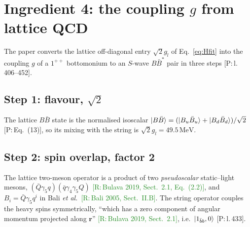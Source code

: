 \documentclass[11pt,a4paper]{article}
\newcommand{\tagP}[1]{\textcolor{blue!65!black}{\textsf{\small[P:\,#1]}}}
\newcommand{\tagR}[1]{\textcolor{ForestGreen}{\textsf{\small[R:\,#1]}}}
\newcommand{\BBst}{B\bar B^*}
\newcommand{\MeV}{\,\mathrm{MeV}}
\begin{document}
\section{Ingredient 4: the coupling $g$ from lattice QCD}
\label{sec:g}

The paper converts the lattice off-diagonal entry $\sqrt2g_l$ of Eq.~\eqref{eq:Hfit} into the coupling $g$ of a $1^{++}$ bottomonium to an $S$-wave $\BBst$ pair in three steps \tagP{l.\,406--452}.

\subsection{Step 1: flavour, $\sqrt2$}
The lattice $B\bar B$ state is the normalised isoscalar $\ket{B\bar B}=(\ket{B_u\bar B_u}+\ket{B_d\bar B_d})/\sqrt2$ \tagP{Eq.~(13)}, so its mixing with the string is $\sqrt2g_l=49.5\MeV$.

\subsection{Step 2: spin overlap, factor 2}

The lattice two-meson operator is a product of two \emph{pseudoscalar} static--light mesons, $(\bar Q\gamma_5q)(\bar q\gamma_4\gamma_5Q)$ \tagR{Bulava 2019, Sect.~2.1, Eq.~(2.2)}, and $B_i=\bar Q\gamma_5q^i$ in Bali \emph{et al.}\ \tagR{Bali 2005, Sect.~II.B}. The string operator couples the heavy spins symmetrically, ``which has a zero component of angular momentum projected along $\bm r$'' \tagR{Bulava 2019, Sect.~2.1}, i.e.\ $\ket{1_{\bar bb},0}$ \tagP{l.\,433}.
\end{document}
